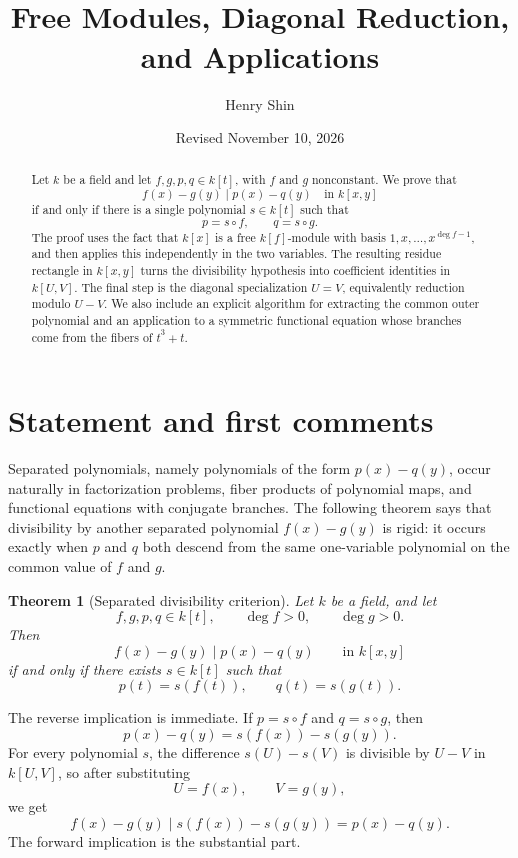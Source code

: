 \documentclass[11pt]{article}
\title{\vspace{-2em}{\Huge\bfseries Divisibility of Separated Polynomials}\\[0.45em]
{\Large Free Modules, Diagonal Reduction, and Applications}}
\author{Henry Shin}
\date{Revised November 10, 2026}
\theoremstyle{plain}
\newtheorem{theorem}{Theorem}[section]
\theoremstyle{definition}
\theoremstyle{remark}
\newcommand{\U}{U}
\newcommand{\V}{V}
\begin{document}
\maketitle

\begin{abstract}
Let \(k\) be a field and let \(f,g,p,q\in k[t]\), with \(f\) and \(g\) nonconstant. We prove that
\[
    f(x)-g(y)\mid p(x)-q(y) \quad \text{in } k[x,y]
\]
if and only if there is a single polynomial \(s\in k[t]\) such that
\[
    p=s\circ f, \qquad q=s\circ g.
\]
The proof uses the fact that \(k[x]\) is a free \(k[f]\)-module with basis
\(1,x,\dots,x^{\deg f-1}\), and then applies this independently in the two variables. The resulting residue rectangle in \(k[x,y]\) turns the divisibility hypothesis into coefficient identities in \(k[U,V]\). The final step is the diagonal specialization \(U=V\), equivalently reduction modulo \(U-V\). We also include an explicit algorithm for extracting the common outer polynomial and an application to a symmetric functional equation whose branches come from the fibers of \(t^3+t\).
\end{abstract}

\section{Statement and first comments}

Separated polynomials, namely polynomials of the form \(p(x)-q(y)\), occur naturally in factorization problems, fiber products of polynomial maps, and functional equations with conjugate branches. The following theorem says that divisibility by another separated polynomial \(f(x)-g(y)\) is rigid: it occurs exactly when \(p\) and \(q\) both descend from the same one-variable polynomial on the common value of \(f\) and \(g\).

\begin{theorem}[Separated divisibility criterion]\label{thm:main}
Let \(k\) be a field, and let
\[
    f,g,p,q\in k[t],
    \qquad \deg f>0,
    \qquad \deg g>0.
\]
Then
\[
    f(x)-g(y)\mid p(x)-q(y)
    \qquad \text{in } k[x,y]
\]
if and only if there exists \(s\in k[t]\) such that
\[
    p(t)=s(f(t)),
    \qquad
    q(t)=s(g(t)).
\]
\end{theorem}

The reverse implication is immediate. If \(p=s\circ f\) and \(q=s\circ g\), then
\[
    p(x)-q(y)=s(f(x))-s(g(y)).
\]
For every polynomial \(s\), the difference \(s(\U)-s(\V)\) is divisible by \(\U-\V\) in \(k[\U,\V]\), so after substituting
\[
    \U=f(x), \qquad \V=g(y),
\]
we get
\[
    f(x)-g(y)
    \mid
    s(f(x))-s(g(y))
    =p(x)-q(y).
\]
The forward implication is the substantial part.
\end{document}

